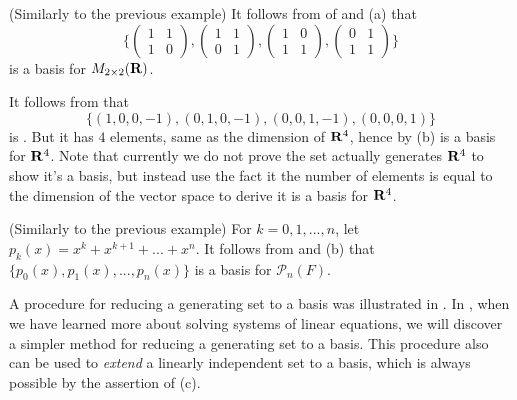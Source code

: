 \begin{example} \label{example 1.6.15}
(Similarly to the previous example) It follows from  of and (a) that
\[
\bigg\{
    \begin{pmatrix}
      1 & 1 \\
      1 & 0
    \end{pmatrix},
    \begin{pmatrix}
      1 & 1 \\
      0 & 1
    \end{pmatrix},
    \begin{pmatrix}
      1 & 0 \\
      1 & 1
    \end{pmatrix},
    \begin{pmatrix}
      0 & 1 \\
      1 & 1
    \end{pmatrix}
\bigg\}
\]
is a basis for \(M_{2 \times 2}(\mathbf{R})\).
\end{example}

\begin{example} \label{example 1.6.16}
It follows from  that
\[
    \{ (1, 0, 0, -1), (0, 1, 0, -1), (0, 0, 1, -1), (0, 0, 0, 1) \}
\]
is \LID{}.
But it has \(4\) elements, same as the dimension of \(\mathbf{R}^4\), hence by (b) is a basis for \(\mathbf{R}^4\).
Note that currently we do not prove the set actually generates \(\mathbf{R}^4\) to show it's a basis, but instead use the fact it the number of elements is equal to the dimension of the vector space to derive it is a basis for \(\mathbf{R}^4\).
\end{example}

\begin{example} \label{example 1.6.17}
(Similarly to the previous example) For \(k = 0, 1, ..., n\), let \(p_k(x) = x^k + x^{k + 1} + ... + x^n\).
It follows from  and (b) that
\(
    \{ p_0(x), p_1(x), ..., p_n(x) \}
\)
is a basis for \(\mathcal{P}_n(F)\).
\end{example}

\begin{remark} \label{remark 1.6.5}
A procedure for reducing a generating set to a basis was illustrated in .
\TODOREF{} In , when we have learned more about solving systems of linear equations, we will discover a simpler method for reducing a generating set to a basis.
This procedure also can be used to \emph{extend} a linearly
independent set to a basis, which is always possible by the assertion of (c).
\end{remark}

